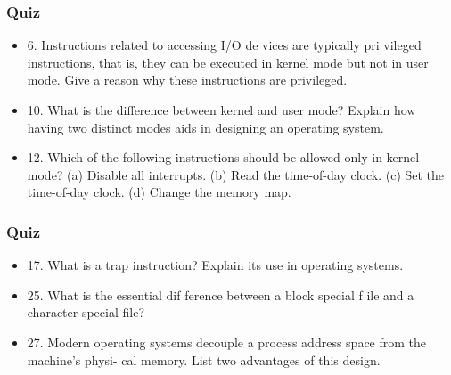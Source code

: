 \begin{frame}
    \frametitle{Quiz}

        \begin{itemize}
        \item
        6. Instructions related to accessing I/O de vices are typically pri vileged instructions, that
        is, they can be executed in kernel mode but not in user mode. Give a reason why these
        instructions are privileged.
        \item 
        10. What is the difference between kernel and user mode? Explain how having two distinct
        modes aids in designing an operating system.
        \item 
        12. Which of the following instructions should be allowed only in kernel mode?
        (a) Disable all interrupts.
        (b) Read the time-of-day clock.
        (c) Set the time-of-day clock.
        (d) Change the memory map.
    \end{itemize}    

\end{frame}

\begin{frame}
    \frametitle{Quiz}
    
    \begin{itemize}
        \item 
        17. What is a trap instruction? Explain its use in operating systems.
        \item 
        25. What is the essential dif ference between a block special f ile and a character special
        file?
        \item
        27. Modern operating systems decouple a process address space from the machine’s physi-
        cal memory. List two advantages of this design.
    \end{itemize}    

\end{frame}

